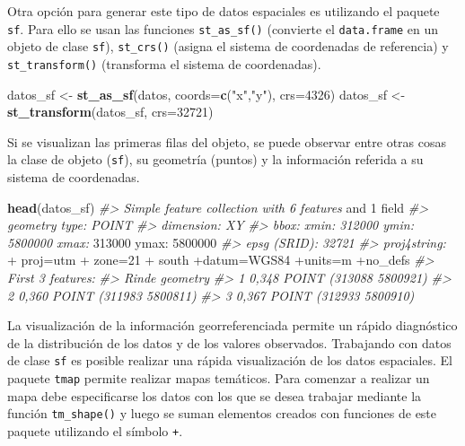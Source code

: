 \documentclass[11pt,b5paper,]{krantz}
\newenvironment{Shaded}{}{}
\newcommand{\CommentTok}[1]{\textcolor[rgb]{0.38,0.63,0.69}{\textit{#1}}}
\newcommand{\DataTypeTok}[1]{\textcolor[rgb]{0.56,0.13,0.00}{#1}}
\newcommand{\DecValTok}[1]{\textcolor[rgb]{0.25,0.63,0.44}{#1}}
\newcommand{\KeywordTok}[1]{\textcolor[rgb]{0.00,0.44,0.13}{\textbf{#1}}}
\newcommand{\NormalTok}[1]{#1}
\newcommand{\OperatorTok}[1]{\textcolor[rgb]{0.40,0.40,0.40}{#1}}
\newcommand{\StringTok}[1]{\textcolor[rgb]{0.25,0.44,0.63}{#1}}
\begin{document}
Otra opción para generar este tipo de datos espaciales es utilizando el paquete \texttt{sf}. Para ello se usan las funciones \texttt{st\_as\_sf()} (convierte el \texttt{data.frame} en un objeto de clase \texttt{sf}), \texttt{st\_crs()} (asigna el sistema de coordenadas de referencia) y \texttt{st\_transform()} (transforma el sistema de coordenadas).

\begin{Shaded}
\begin{Highlighting}[]
\NormalTok{datos_sf <-}\StringTok{ }\KeywordTok{st_as_sf}\NormalTok{(datos, }\DataTypeTok{coords=}\KeywordTok{c}\NormalTok{(}\StringTok{"x"}\NormalTok{,}\StringTok{"y"}\NormalTok{), }
                     \DataTypeTok{crs=}\DecValTok{4326}\NormalTok{)}
\NormalTok{datos_sf <-}\StringTok{ }\KeywordTok{st_transform}\NormalTok{(datos_sf, }\DataTypeTok{crs=}\DecValTok{32721}\NormalTok{)}
\end{Highlighting}
\end{Shaded}

Si se visualizan las primeras filas del objeto, se puede observar entre otras cosas la clase de objeto (\texttt{sf}), su geometría (puntos) y la información referida a su sistema de coordenadas.

\begin{Shaded}
\begin{Highlighting}[]
\KeywordTok{head}\NormalTok{(datos_sf)}
\CommentTok{#> Simple feature collection with 6 features}
\NormalTok{and }\DecValTok{1}\NormalTok{ field}
\CommentTok{#> geometry type: POINT}
\CommentTok{#> dimension: XY}
\CommentTok{#> bbox: xmin: 312000 ymin: 5800000 xmax:}
\DecValTok{313000}\NormalTok{ ymax}\OperatorTok{:}\StringTok{ }\DecValTok{5800000}
\CommentTok{#> epsg (SRID): 32721}
\CommentTok{#> proj4string: }
    \OperatorTok{+}\StringTok{ }\NormalTok{proj=utm }
    \OperatorTok{+}\StringTok{ }\NormalTok{zone=}\DecValTok{21} 
    \OperatorTok{+}\StringTok{ }\NormalTok{south}
\OperatorTok{+}\NormalTok{datum=WGS84 }\OperatorTok{+}\NormalTok{units=m }\OperatorTok{+}\NormalTok{no_defs}
\CommentTok{#> First 3 features:}
\CommentTok{#> Rinde geometry}
\CommentTok{#> 1 0,348 POINT (313088 5800921)}
\CommentTok{#> 2 0,360 POINT (311983 5800811)}
\CommentTok{#> 3 0,367 POINT (312933 5800910)}
\end{Highlighting}
\end{Shaded}

La visualización de la información georreferenciada permite un rápido diagnóstico de la distribución de los datos y de los valores observados. Trabajando con datos de clase \texttt{sf} es posible realizar una rápida visualización de los datos espaciales. El paquete \texttt{tmap} permite realizar mapas temáticos. Para comenzar a realizar un mapa debe especificarse los datos con los que se desea trabajar mediante la función \texttt{tm\_shape()} y luego se suman elementos creados con funciones de este paquete utilizando el símbolo \texttt{+}.
\end{document}
